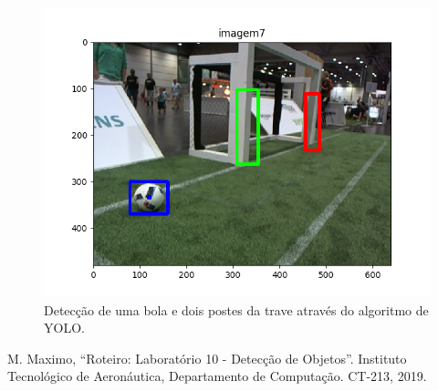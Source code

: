\documentclass[conference]{IEEEtran}
\begin{document}
\begin{figure}[htbp]
\centering
\centerline{\includegraphics[scale=0.5]{imagens/imagem7_detection.png}}
\caption{Detecção de uma bola e dois postes da trave através do algoritmo de YOLO.}
\label{imagem7_detection}
\end{figure}




\begin{thebibliography}{00}
 M. Maximo, ``Roteiro: Laboratório 10 - Detecção de Objetos''. Instituto Tecnológico de Aeronáutica, Departamento de Computação. CT-213, 2019.
\end{thebibliography}
\end{document}
